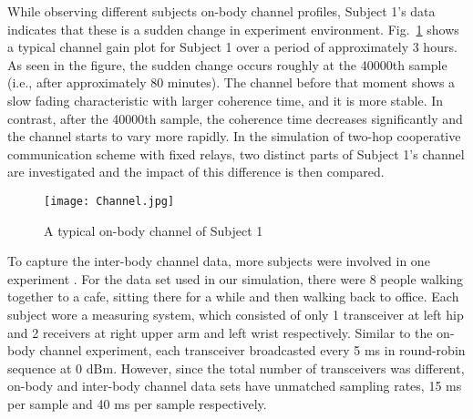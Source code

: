 \documentclass[12pt,draftcls,a4paper,onecolumn,journal]{IEEEtran}
\begin{document}
While observing different subjects on-body channel profiles, Subject 1's data indicates that these is a sudden change in experiment environment. Fig.~\ref{fig: channel_s1} shows a typical channel gain plot for Subject 1 over a period of approximately 3 hours. As seen in the figure, the sudden change occurs roughly at the 40000th sample (i.e., after approximately 80 minutes). The channel before that moment shows a slow fading characteristic with larger coherence time, and it is more stable. In contrast, after the 40000th sample, the coherence time decreases significantly and the channel starts to vary more rapidly. In the simulation of two-hop cooperative communication scheme with fixed relays, two distinct parts of Subject 1's channel are investigated and the impact of this difference is then compared.

\begin{figure}[]
\centering
\texttt{[image: Channel.jpg]}
\caption{A typical on-body channel of Subject 1}
\label{fig: channel_s1}
\end{figure}

To capture the inter-body channel data, more subjects were involved in one experiment \cite{NICTAdata,Dong:ICC:2013}. For the data set used in our simulation, there were 8 people walking together to a cafe, sitting there for a while and then walking back to office. Each subject wore a measuring system, which consisted of only 1 transceiver at left hip and 2 receivers at right upper arm and left wrist respectively. Similar to the on-body channel experiment, each transceiver broadcasted every 5 ms in round-robin sequence at 0 dBm. However, since the total number of transceivers was different, on-body and inter-body channel data sets have unmatched sampling rates, 15 ms per sample and 40 ms per sample respectively.
\end{document}
